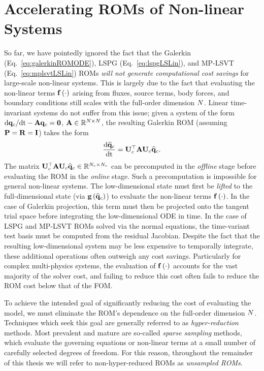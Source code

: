 \section{Accelerating ROMs of Non-linear Systems}\label{sec:hyperreduction}

So far, we have pointedly ignored the fact that the Galerkin (Eq.~\ref{eq:galerkinROMODE}), LSPG (Eq.~\ref{eq:lspgLSLin}), and MP-LSVT (Eq.~\ref{eq:mplsvtLSLin}) ROMs \textit{will not generate computational cost savings} for large-scale non-linear systems. This is largely due to the fact that evaluating the non-linear terms $\mathbf{f} \left(\cdot\right)$ arising from fluxes, source terms, body forces, and boundary conditions still scales with the full-order dimension $N$. Linear time-invariant systems do not suffer from this issue; given a system of the form $\text{d}\mathbf{q}_{c}/\text{d}\text{t} - \mathbf{A} \mathbf{q}_{c} = \mathbf{0}$, $\mathbf{A} \in \mathbb{R}^{N \times N}$, the resulting Galerkin ROM (assuming $\consScale = \resScale = \identMat$) takes the form
%
\begin{equation}
    \ode{\consVecCoef}{\timeVar} = \consTrial^\top \dummyMat \consTrial \consVecCoef.
\end{equation}
%
The matrix $\consTrial^\top \dummyMat \consTrial \consVecCoef \inRTwo{\numConsModes}{\numConsModes}$ can be precomputed in the \textit{offline} stage before evaluating the ROM in the \textit{online} stage. Such a precomputation is impossible for general non-linear systems. The low-dimensional state must first be \textit{lifted} to the full-dimensional state (via $\mathbf{g} \left(\mathbf{\widehat{q}}_{c}\right)$) to evaluate the non-linear terms $\mathbf{f} \left(\cdot\right)$. In the case of Galerkin projection, this term must then be projected onto the tangent trial space before integrating the low-dimensional ODE in time. In the case of LSPG and MP-LSVT ROMs solved via the normal equations, the time-variant test basis must be computed from the residual Jacobian. Despite the fact that the resulting low-dimensional system may be less expensive to temporally integrate, these additional operations often outweigh any cost savings. Particularly for complex multi-physics systems, the evaluation of $\mathbf{f} \left(\cdot\right)$ accounts for the vast majority of the solver cost, and failing to reduce this cost often fails to reduce the ROM cost below that of the FOM.

To achieve the intended goal of significantly reducing the cost of evaluating the model, we must eliminate the ROM's dependence on the full-order dimension $N$. Techniques which seek this goal are generally referred to as \textit{hyper-reduction} methods. Most prevalent and mature are so-called \textit{sparse sampling} methods, which evaluate the governing equations or non-linear terms at a small number of carefully selected degrees of freedom. For this reason, throughout the remainder of this thesis we will refer to non-hyper-reduced ROMs as \textit{unsampled ROMs}.

